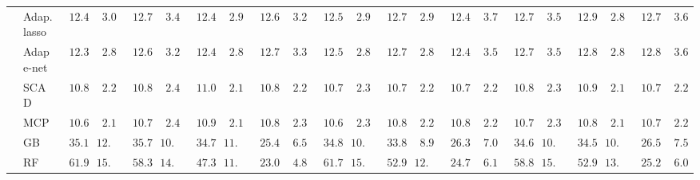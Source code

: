 \begin{tabular}{llllllllllllllllllllll}
	& Adap. lasso  & $\phantom{0}12.442$ & $\phantom{0}3.003$ & $\phantom{0}12.793$ & $\phantom{0}3.416$ & $\phantom{0}12.469$ & $\phantom{0}2.929$ & $\phantom{0}12.659$ & $\phantom{0}3.286$ & $\phantom{0}12.592$ & $\phantom{0}2.977$ & $\phantom{0}12.753$ & $\phantom{0}2.945$ & $\phantom{0}12.457$ & $\phantom{0}3.749$ & $\phantom{0}12.743$ & $\phantom{0}3.599$ & $\phantom{0}12.906$ & $\phantom{0}2.843$ & $\phantom{0}12.787$ & $\phantom{0}3.655$ \\
	& Adap e-net  & $\phantom{0}12.344$ & $\phantom{0}2.884$ & $\phantom{0}12.689$ & $\phantom{0}3.276$ & $\phantom{0}12.423$ & $\phantom{0}2.875$ & $\phantom{0}12.742$ & $\phantom{0}3.309$ & $\phantom{0}12.578$ & $\phantom{0}2.802$ & $\phantom{0}12.728$ & $\phantom{0}2.804$ & $\phantom{0}12.487$ & $\phantom{0}3.549$ & $\phantom{0}12.708$ & $\phantom{0}3.515$ & $\phantom{0}12.822$ & $\phantom{0}2.821$ & $\phantom{0}12.883$ & $\phantom{0}3.698$ \\
	& SCAD  & $\phantom{0}10.804$ & $\phantom{0}2.240$ & $\phantom{0}10.827$ & $\phantom{0}2.465$ & $\phantom{0}11.096$ & $\phantom{0}2.163$ & $\phantom{0}10.872$ & $\phantom{0}2.215$ & $\phantom{0}10.718$ & $\phantom{0}2.301$ & $\phantom{0}10.768$ & $\phantom{0}2.245$ & $\phantom{0}10.749$ & $\phantom{0}2.297$ & $\phantom{0}10.804$ & $\phantom{0}2.313$ & $\phantom{0}10.912$ & $\phantom{0}2.156$ & $\phantom{0}10.713$ & $\phantom{0}2.255$ \\
	& MCP  & $\phantom{0}10.657$ & $\phantom{0}2.192$ & $\phantom{0}10.745$ & $\phantom{0}2.484$ & $\phantom{0}10.982$ & $\phantom{0}2.177$ & $\phantom{0}10.802$ & $\phantom{0}2.341$ & $\phantom{0}10.680$ & $\phantom{0}2.327$ & $\phantom{0}10.838$ & $\phantom{0}2.281$ & $\phantom{0}10.848$ & $\phantom{0}2.263$ & $\phantom{0}10.752$ & $\phantom{0}2.315$ & $\phantom{0}10.824$ & $\phantom{0}2.137$ & $\phantom{0}10.706$ & $\phantom{0}2.249$ \\
	& GB  & $\phantom{0}35.185$ & $12.026$ & $\phantom{0}35.724$ & $10.740$ & $\phantom{0}34.796$ & $11.994$ & $\phantom{0}25.465$ & $\phantom{0}6.593$ & $\phantom{0}34.832$ & $10.704$ & $\phantom{0}33.856$ & $\phantom{0}8.918$ & $\phantom{0}26.327$ & $\phantom{0}7.057$ & $\phantom{0}34.641$ & $10.940$ & $\phantom{0}34.518$ & $10.047$ & $\phantom{0}26.503$ & $\phantom{0}7.561$ \\
	& RF  & $\phantom{0}61.937$ & $15.929$ & $\phantom{0}58.397$ & $14.389$ & $\phantom{0}47.302$ & $11.784$ & $\phantom{0}23.032$ & $\phantom{0}4.826$ & $\phantom{0}61.755$ & $15.868$ & $\phantom{0}52.935$ & $12.555$ & $\phantom{0}24.747$ & $\phantom{0}6.186$ & $\phantom{0}58.857$ & $15.627$ & $\phantom{0}52.980$ & $13.097$ & $\phantom{0}25.289$ & $\phantom{0}6.085$ \\

\end{tabular}
